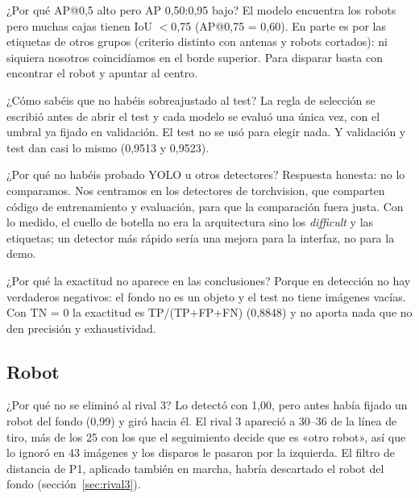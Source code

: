 \documentclass[11pt,a4paper]{article}
\newcommand{\gr}{\textdegree{}}
\begin{document}
\begin{pregunta}{¿Por qué AP@0,5 alto pero AP 0,50:0,95 bajo?}
El modelo encuentra los robots pero muchas cajas tienen IoU $<$0,75 (AP@0,75 = 0,60). En parte es por las etiquetas de otros grupos (criterio distinto con antenas y robots cortados): ni siquiera nosotros coincidíamos en el borde superior. Para disparar basta con encontrar el robot y apuntar al centro.
\end{pregunta}

\begin{pregunta}{¿Cómo sabéis que no habéis sobreajustado al test?}
La regla de selección se escribió antes de abrir el test y cada modelo se evaluó una única vez, con el umbral ya fijado en validación. El test no se usó para elegir nada. Y validación y test dan casi lo mismo (0,9513 y 0,9523).
\end{pregunta}

\begin{pregunta}{¿Por qué no habéis probado YOLO u otros detectores?}
Respuesta honesta: no lo comparamos. Nos centramos en los detectores de torchvision, que comparten código de entrenamiento y evaluación, para que la comparación fuera justa. Con lo medido, el cuello de botella no era la arquitectura sino los \emph{difficult} y las etiquetas; un detector más rápido sería una mejora para la interfaz, no para la demo.
\end{pregunta}

\begin{pregunta}{¿Por qué la exactitud no aparece en las conclusiones?}
Porque en detección no hay verdaderos negativos: el fondo no es un objeto y el test no tiene imágenes vacías. Con TN = 0 la exactitud es TP/(TP+FP+FN) (0,8848) y no aporta nada que no den precisión y exhaustividad.
\end{pregunta}

\subsection*{Robot}

\begin{pregunta}{¿Por qué no se eliminó al rival 3?}
Lo detectó con 1,00, pero antes había fijado un robot del fondo (0,99) y giró hacia él. El rival 3 apareció a 30--36\gr{} de la línea de tiro, más de los 25\gr{} con los que el seguimiento decide que es «otro robot», así que lo ignoró en 43 imágenes y los disparos le pasaron por la izquierda. El filtro de distancia de P1, aplicado también en marcha, habría descartado el robot del fondo (sección~\ref{sec:rival3}).
\end{pregunta}
\end{document}
